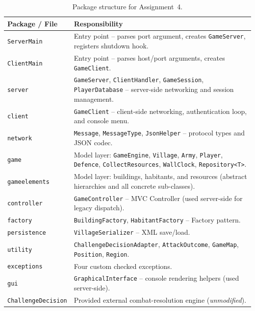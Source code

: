 \documentclass[format=acmsmall, review=false, screen=true]{acmart}
\begin{document}
\begin{table}[h]
  \centering
  \caption{Package structure for Assignment~4.}
  \label{tbl:packages}
  \begin{tabularx}{\linewidth}{lX}
    \toprule
    \textbf{Package / File} & \textbf{Responsibility} \\
    \midrule
    \texttt{ServerMain} & Entry point -- parses port argument, creates \texttt{GameServer}, registers shutdown hook. \\
    \texttt{ClientMain} & Entry point -- parses host/port arguments, creates \texttt{GameClient}. \\
    \texttt{server} & \texttt{GameServer}, \texttt{ClientHandler}, \texttt{GameSession}, \texttt{PlayerDatabase} -- server-side networking and session management. \\
    \texttt{client} & \texttt{GameClient} -- client-side networking, authentication loop, and console menu. \\
    \texttt{network} & \texttt{Message}, \texttt{MessageType}, \texttt{JsonHelper} -- protocol types and JSON codec. \\
    \texttt{game} & Model layer: \texttt{GameEngine}, \texttt{Village}, \texttt{Army}, \texttt{Player}, \texttt{Defence}, \texttt{CollectResources}, \texttt{WallClock}, \texttt{Repository<T>}. \\
    \texttt{gameelements} & Model layer: buildings, habitants, and resources (abstract hierarchies and all concrete sub-classes). \\
    \texttt{controller} & \texttt{GameController} -- MVC Controller (used server-side for legacy dispatch). \\
    \texttt{factory} & \texttt{BuildingFactory}, \texttt{HabitantFactory} -- Factory pattern. \\
    \texttt{persistence} & \texttt{VillageSerializer} -- XML save/load. \\
    \texttt{utility} & \texttt{ChallengeDecisionAdapter}, \texttt{AttackOutcome}, \texttt{GameMap}, \texttt{Position}, \texttt{Region}. \\
    \texttt{exceptions} & Four custom checked exceptions. \\
    \texttt{gui} & \texttt{GraphicalInterface} -- console rendering helpers (used server-side). \\
    \texttt{ChallengeDecision} & Provided external combat-resolution engine (\emph{unmodified}). \\
    \bottomrule
  \end{tabularx}
\end{table}
\end{document}
